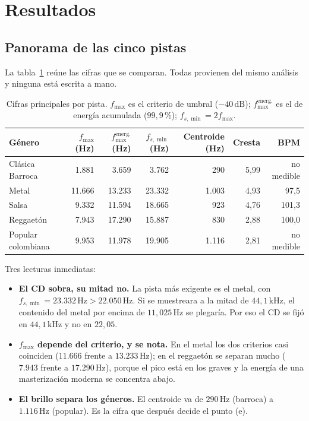 \documentclass[11pt,a4paper]{article}
\newcommand{\fsmin}{f_{s,\min}}
\newcommand{\fmax}{f_{\max}}
\newcommand{\dB}{\,\mathrm{dB}}
\newcommand{\Hz}{\,\mathrm{Hz}}
\newcommand{\kHz}{\,\mathrm{kHz}}
\begin{document}
\section{Resultados}\label{sec:resultados}

\subsection{Panorama de las cinco pistas}

La tabla~\ref{tab:cifras} reúne las cifras que se comparan. Todas provienen
del mismo análisis y ninguna está escrita a mano.

\begin{table}[H]
\centering
\small
\begin{tabular}{@{}l r r r r r r@{}}
\toprule
\textbf{Género} & \(\fmax\) (Hz) & \(\fmax^{\text{energ.}}\) (Hz) &
\(\fsmin\) (Hz) & Centroide (Hz) & Cresta & BPM \\
\midrule
Clásica\,\textperiodcentered{}\,Barroca & 1.881 & 3.659 & 3.762 & 290 & 5,99 & no medible \\
Metal & 11.666 & 13.233 & 23.332 & 1.003 & 4,93 & 97,5 \\
Salsa & 9.332 & 11.594 & 18.665 & 923 & 4,76 & 101,3 \\
Reggaetón & 7.943 & 17.290 & 15.887 & 830 & 2,88 & 100,0 \\
Popular colombiana & 9.953 & 11.978 & 19.905 & 1.116 & 2,81 & no medible \\
\bottomrule
\end{tabular}
\caption{Cifras principales por pista. \(\fmax\) es el criterio de umbral
(\(-40\dB\)); \(\fmax^{\text{energ.}}\) es el de energía acumulada
(\(99{,}9\)\,\%); \(\fsmin = 2\fmax\).}
\label{tab:cifras}
\end{table}

Tres lecturas inmediatas:

\begin{itemize}
  \item \textbf{El CD sobra, su mitad no.} La pista más exigente es el metal,
        con \(\fsmin = 23.332\Hz > 22.050\Hz\). Si se muestreara a la mitad de
        \(44{,}1\kHz\), el contenido del metal por encima de \(11{,}025\Hz\) se
        plegaría. Por eso el CD se fijó en \(44{,}1\kHz\) y no en \(22{,}05\).
  \item \textbf{\(\fmax\) depende del criterio, y se nota.} En el metal los dos
        criterios casi coinciden (\(11.666\) frente a \(13.233\Hz\)); en el
        reggaetón se separan mucho (\(7.943\) frente a \(17.290\Hz\)), porque
        el pico está en los graves y la energía de una masterización moderna se
        concentra abajo.
  \item \textbf{El brillo separa los géneros.} El centroide va de \(290\Hz\)
        (barroca) a \(1.116\Hz\) (popular). Es la cifra que después decide el
        punto (e).
\end{itemize}
\end{document}
